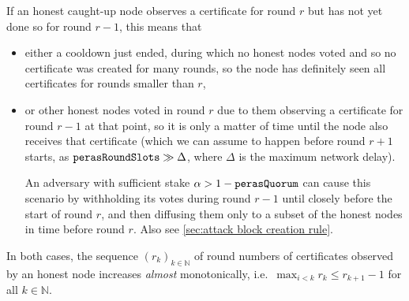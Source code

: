 If an honest caught-up node observes a certificate for round $r$ but has not yet done so for round $r-1$, this means that
\begin{itemize}
\item
  either a cooldown just ended, during which no honest nodes voted and so no certificate was created for many rounds, so the node has definitely seen all certificates for rounds smaller than $r$,
\item
  or other honest nodes voted in round $r$ due to them observing a certificate for round $r-1$ at that point, so it is only a matter of time until the node also receives that certificate (which we can assume to happen before round $r+1$ starts, as $\mathtt{perasRoundSlots} \gg \Delta$, where $\Delta$ is the maximum network delay).

  An adversary with sufficient stake $\alpha > 1-\mathtt{perasQuorum}$ can cause this scenario by withholding its votes during round $r-1$ until closely before the start of round $r$, and then diffusing them only to a subset of the honest nodes in time before round $r$.
  Also see \cref{sec:attack block creation rule}.
\end{itemize}
In both cases, the sequence ${(r_k)}_{k\in\mathbb{N}}$ of round numbers of certificates observed by an honest node increases \emph{almost} monotonically, i.e.\ $\max_{i<k} r_k \le  r_{k+1} - 1$ for all $k\in\mathbb{N}$.

